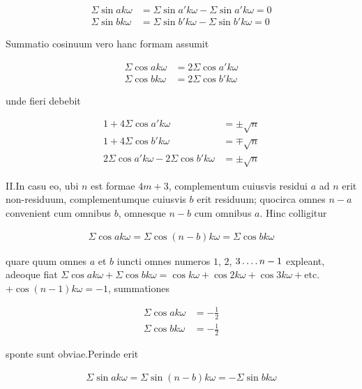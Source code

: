 \[
\begin{aligned}
\Sigma\sin ak\omega&=\Sigma\sin a'k\omega-\Sigma\sin a'k\omega=0\\
\Sigma\sin bk\omega&=\Sigma\sin b'k\omega-\Sigma\sin b'k\omega=0
\end{aligned}
\]

Summatio cosinuum vero hanc formam assumit

\[
\begin{aligned}
\Sigma\cos ak\omega&=2\Sigma\cos a'k\omega\\
\Sigma\cos bk\omega&=2\Sigma\cos b'k\omega
\end{aligned}
\]

unde fieri debebit

\[
\begin{aligned}
1+4\Sigma\cos a'k\omega&=\pm\surd n\\
1+4\Sigma\cos b'k\omega&=\mp\surd n\\
2\Sigma\cos a'k\omega-2\Sigma\cos b'k\omega&=\pm\surd n
\end{aligned}
\]

II.\quad In casu eo, ubi $n$ est formae $4m+3$, complementum cuiusvis residui $a$ ad $n$ erit non-residuum, complementumque cuiusvis $b$ erit residuum; quocirca omnes $n-a$ convenient cum omnibus $b$, omnesque $n-b$ cum omnibus $a$. Hinc colligitur

\[
\begin{aligned}
\Sigma\cos ak\omega=\Sigma\cos(n-b)k\omega=\Sigma\cos bk\omega
\end{aligned}
\]

quare quum omnes $a$ et $b$ iuncti omnes numeros $1$, $2$, $3\mathinner{.\,.\,.\,.} n-1$ expleant, adeoque fiat $\Sigma\cos ak\omega+\Sigma\cos bk\omega=\cos k\omega+\cos2k\omega+\cos3k\omega+\text{etc.}$ $+\cos(n-1)k\omega=-1$, summationes

\[
\begin{aligned}
\Sigma\cos ak\omega&=-\tfrac12\\
\Sigma\cos bk\omega&=-\tfrac12
\end{aligned}
\]

sponte sunt obviae.\quad Perinde erit

\[
\begin{aligned}
\Sigma\sin ak\omega=\Sigma\sin(n-b)k\omega=-\Sigma\sin bk\omega
\end{aligned}
\]

